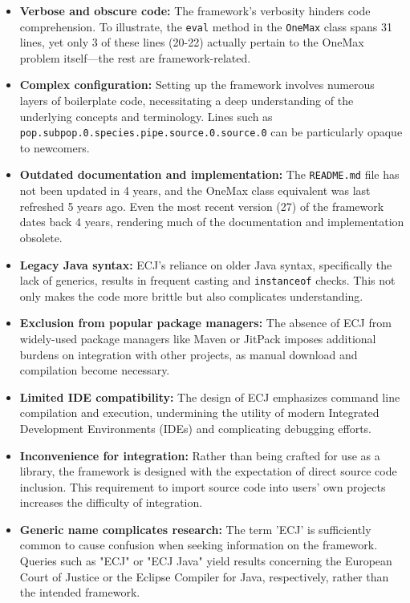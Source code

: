 \begin{itemize}
  \item \textbf{Verbose and obscure code:} The framework's verbosity hinders code comprehension. To illustrate, the \texttt{eval} method in the \texttt{OneMax} class spans 31 lines, yet only 3 of these lines (20-22) actually pertain to the OneMax problem itself—the rest are framework-related.

  \item \textbf{Complex configuration:} Setting up the framework involves numerous layers of boilerplate code, necessitating a deep understanding of the underlying concepts and terminology. Lines such as \texttt{pop.subpop.0.species.pipe.source.0.source.0} can be particularly opaque to newcomers.

  \item \textbf{Outdated documentation and implementation:} The \texttt{README.md} file has not been updated in 4 years, and the OneMax class equivalent was last refreshed 5 years ago. Even the most recent version (27) of the framework dates back 4 years, rendering much of the documentation and implementation obsolete.

  \item \textbf{Legacy Java syntax:} ECJ's reliance on older Java syntax, specifically the lack of generics, results in frequent casting and \texttt{instanceof} checks. This not only makes the code more brittle but also complicates understanding.

  \item \textbf{Exclusion from popular package managers:} The absence of ECJ from widely-used package managers like Maven or JitPack imposes additional burdens on integration with other projects, as manual download and compilation become necessary.

  \item \textbf{Limited IDE compatibility:} The design of ECJ emphasizes command line compilation and execution, undermining the utility of modern Integrated Development Environments (IDEs) and complicating debugging efforts.

  \item \textbf{Inconvenience for integration:} Rather than being crafted for use as a library, the framework is designed with the expectation of direct source code inclusion. This requirement to import source code into users' own projects increases the difficulty of integration.

  \item \textbf{Generic name complicates research:} The term 'ECJ' is sufficiently common to cause confusion when seeking information on the framework. Queries such as "ECJ" or "ECJ Java" yield results concerning the European Court of Justice or the Eclipse Compiler for Java, respectively, rather than the intended framework.


\end{itemize}
